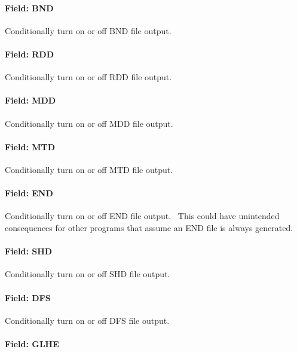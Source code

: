 \paragraph{Field: BND}\label{field-bnd}

Conditionally turn on or off BND file output.

\paragraph{Field: RDD}\label{field-rdd}

Conditionally turn on or off RDD file output.

\paragraph{Field: MDD}\label{field-mdd}

Conditionally turn on or off MDD file output.

\paragraph{Field: MTD}\label{field-mtd}

Conditionally turn on or off MTD file output.

\paragraph{Field: END}\label{field-end}

Conditionally turn on or off END file output.~ This could have unintended consequences for other programs that assume an END file is always generated.

\paragraph{Field: SHD}\label{field-shd}

Conditionally turn on or off SHD file output.

\paragraph{Field: DFS}\label{field-dfs}

Conditionally turn on or off DFS file output.

\paragraph{Field: GLHE}\label{field-glhe}

